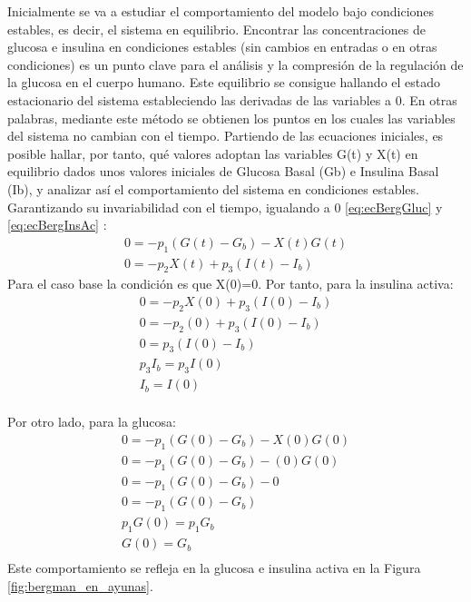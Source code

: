 Inicialmente se va a estudiar el comportamiento del modelo bajo condiciones estables, es decir, el sistema en equilibrio. Encontrar las concentraciones de glucosa e insulina en condiciones estables (sin cambios en entradas o en otras condiciones) es un punto clave para el análisis y la compresión de la regulación de la glucosa en el cuerpo humano. Este equilibrio se consigue hallando el estado estacionario del sistema estableciendo las derivadas de las variables a 0. En otras palabras, mediante este método se obtienen los puntos en los cuales las variables del sistema no cambian con el tiempo.
Partiendo de las ecuaciones iniciales, es posible hallar, por tanto, qué valores adoptan las variables G(t) y X(t) en equilibrio dados unos valores iniciales de Glucosa Basal (Gb) e Insulina Basal (Ib), y analizar así el comportamiento del sistema en condiciones estables.
Garantizando su invariabilidad con el tiempo, igualando a 0 \eqref{eq:ecBergGluc} y \eqref{eq:ecBergInsAc} :
\begin{align}
    0= -p_1 (G(t) - G_b) - X(t)G(t) \\
    0= -p_2 X(t) + p_3(I(t) - I_b) 
\end{align}
Para el caso base la condición es que X(0)=0. 
Por tanto, para la insulina activa:
\begin{align*}
    0= -p_2 X(0) + p_3(I(0) - I_b) \\
    0= -p_2 (0) + p_3(I(0) - I_b) \\
    0= p_3(I(0) - I_b) \\
    p_3 I_b= p_3 I(0) \\
    I_b = I(0) \\
\end{align*}

Por otro lado, para la glucosa:
\begin{align*}
    0= -p_1 (G(0) - G_b) - X(0)G(0) \\
    0= -p_1 (G(0) - G_b) - (0)G(0) \\
    0= -p_1 (G(0) - G_b) - 0 \\
    0= -p_1 (G(0) - G_b) \\
    p_1 G(0)= p_1 G_b \\
    G(0) = G_b \\
\end{align*}
Este comportamiento se refleja en la glucosa e insulina activa en la Figura \ref{fig:bergman_en_ayunas}.

